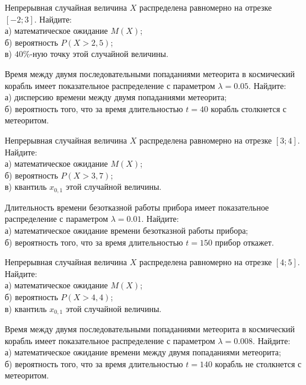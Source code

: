 \vfill

\newpage\setcounter{zad}{0}

\z Непрерывная случайная величина $X$ распределена равномерно на отрезке $[-2; 3]$. Найдите: \\ \quad а) математическое ожидание $M(X)$; \\ \quad б) вероятность $P(X>2{,}5)$; \\ \quad в) $40\%$-ную точку этой случайной величины.


\vfill

\z Время между двумя последовательными попаданиями метеорита в космический корабль имеет показательное распределение с параметром $\lambda = 0.05$. Найдите: \\ \quad а) дисперсию времени между двумя попаданиями метеорита; \\ \quad б) вероятность того, что за время длительностью $t = 40$ корабль  столкнется с метеоритом.
 

\vfill

\newpage\setcounter{zad}{0}

\z Непрерывная случайная величина $X$ распределена равномерно на отрезке $[3; 4]$. Найдите: \\ \quad а) математическое ожидание $M(X)$; \\ \quad б) вероятность $P(X>3{,}7)$; \\ \quad в) квантиль $x_{0{,}1}$ этой случайной величины.


\vfill

\z Длительность времени безотказной работы прибора имеет показательное распределение с параметром $\lambda = 0.01$. Найдите: \\ \quad а) математическое ожидание времени безотказной работы прибора; \\ \quad б) вероятность того, что за время длительностью $t = 150$ прибор  откажет.
 

\vfill

\newpage\setcounter{zad}{0}

\z Непрерывная случайная величина $X$ распределена равномерно на отрезке $[4; 5]$. Найдите: \\ \quad а) математическое ожидание $M(X)$; \\ \quad б) вероятность $P(X>4{,}4)$; \\ \quad в) квантиль $x_{0{,}1}$ этой случайной величины.


\vfill

\z Время между двумя последовательными попаданиями метеорита в космический корабль имеет показательное распределение с параметром $\lambda = 0.008$. Найдите: \\ \quad а) математическое ожидание времени между двумя попаданиями метеорита; \\ \quad б) вероятность того, что за время длительностью $t = 140$ корабль не столкнется с метеоритом.
 


